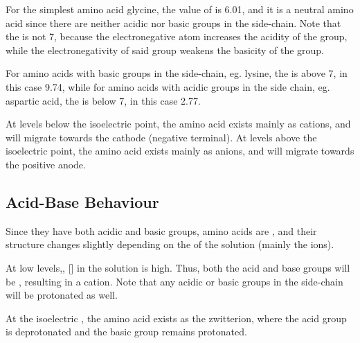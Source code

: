			For the simplest amino acid glycine, the value of \pI{} is \num{6.01}, and it is a neutral amino acid since there are neither
			acidic nor basic groups in the side-chain. Note that the \pI{} is not \num{7}, because the electronegative  atom
			increases the acidity of the  group, while the electronegativity of said group weakens the basicity of the  group.

			For amino acids with basic groups in the side-chain, eg. lysine, the \pI{} is above \num{7}, in this case \num{9.74}, while for
			amino acids with acidic groups in the side chain, eg. aspartic acid, the \pI{} is below \num{7}, in this case \num{2.77}.

			At \pH{} levels below the isoelectric point, the amino acid exists mainly as cations, and will migrate towards the
			cathode (negative terminal). At \pH{} levels above the isoelectric point, the amino acid exists mainly as anions, and will
			migrate towards the positive anode.



		\subsection{Acid-Base Behaviour}

			Since they have both acidic and basic groups, amino acids are , and their structure changes slightly depending
			on the \pH{} of the solution (mainly the  ions).


			At low \pH{} levels,, [] in the solution is high. Thus, both the acid and base groups will be , resulting in a
			cation. Note that any acidic or basic groups in the side-chain will be protonated as well.

			At the isoelectric \pH{}, the amino acid exists as the zwitterion, where the acid group is deprotonated and the basic group remains
			protonated.

